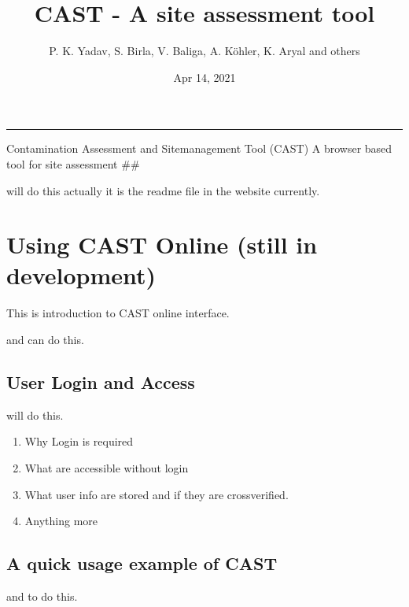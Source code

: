 \documentclass[letterpaper,10pt,english]{sphinxmanual}
\title{CAST - A site assessment tool}
\date{Apr 14, 2021}
\author{P.\@{} K.\@{} Yadav, S.\@{} Birla, V.\@{} Baliga, A.\@{} Köhler, K.\@{} Aryal and others}
\begin{document}
\pagestyle{empty}
\sphinxmaketitle
\pagestyle{plain}
\sphinxtableofcontents
\pagestyle{normal}
\label{\detokenize{intro::doc}}



\bigskip\hrule\bigskip


\sphinxAtStartPar
Contamination Assessment and Site\sphinxhyphen{}management Tool (CAST) \sphinxhyphen{} A browser based tool for site assessment \#\#

\sphinxAtStartPar
{} will do this \sphinxhyphen{} actually it is the readme file in the website currently.


\chapter{Using CAST Online (still in development)}
\label{\detokenize{contents/online/online_usage:using-cast-online-still-in-development}}\label{\detokenize{contents/online/online_usage::doc}}
\sphinxAtStartPar
This is introduction to CAST online interface.

\sphinxAtStartPar
{} and  can do this.


\section{User Login and Access}
\label{\detokenize{contents/online/login:user-login-and-access}}\label{\detokenize{contents/online/login::doc}}
\sphinxAtStartPar
{} will do this.
\begin{enumerate}
%
\item {} 
\sphinxAtStartPar
Why Login is required

\item {} 
\sphinxAtStartPar
What are accessible without login

\item {} 
\sphinxAtStartPar
What user info are stored and if they are cross\sphinxhyphen{}verified.

\item {} 
\sphinxAtStartPar
Anything more

\end{enumerate}


\section{A quick usage example of CAST}
\label{\detokenize{contents/online/quick_example:a-quick-usage-example-of-cast}}\label{\detokenize{contents/online/quick_example::doc}}
\sphinxAtStartPar
{} and  to do this.
\end{document}
